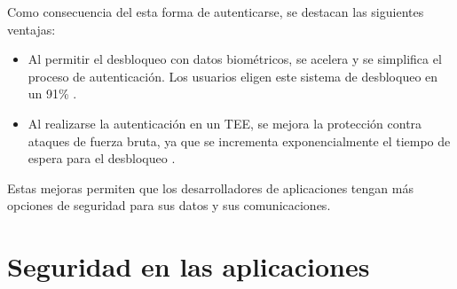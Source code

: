 Como consecuencia del esta forma de autenticarse, se destacan las siguientes ventajas:
\begin{itemize}
    \item Al permitir el desbloqueo con datos biométricos, se acelera y se simplifica el proceso de autenticaci\'on. Los usuarios eligen este sistema de desbloqueo en un 91\% \cite{asreview2015}.
    \item Al realizarse la autenticaci\'on en un TEE, se mejora la protección contra ataques de fuerza bruta, ya que se incrementa exponencialmente el tiempo de espera para el desbloqueo \cite{asreview2015}.
\end{itemize}
Estas mejoras permiten que los desarrolladores de aplicaciones tengan más opciones de seguridad para sus datos y sus comunicaciones.
\section{Seguridad en las aplicaciones}

